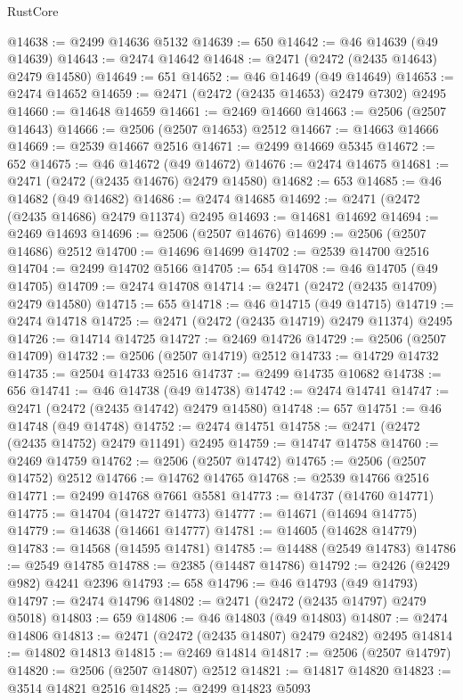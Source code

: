 \begin{lexlean}{RustCore}
\begin{coremodule}
@14638 := @2499 @14636 @5132
@14639 := 650
@14642 := @46 @14639 (@49 @14639)
@14643 := @2474 @14642
@14648 := @2471 (@2472 (@2435 @14643) @2479 @14580)
@14649 := 651
@14652 := @46 @14649 (@49 @14649)
@14653 := @2474 @14652
@14659 := @2471 (@2472 (@2435 @14653) @2479 @7302) @2495
@14660 := @14648 @14659
@14661 := @2469 @14660
@14663 := @2506 (@2507 @14643)
@14666 := @2506 (@2507 @14653) @2512
@14667 := @14663 @14666
@14669 := @2539 @14667 @2516
@14671 := @2499 @14669 @5345
@14672 := 652
@14675 := @46 @14672 (@49 @14672)
@14676 := @2474 @14675
@14681 := @2471 (@2472 (@2435 @14676) @2479 @14580)
@14682 := 653
@14685 := @46 @14682 (@49 @14682)
@14686 := @2474 @14685
@14692 := @2471 (@2472 (@2435 @14686) @2479 @11374) @2495
@14693 := @14681 @14692
@14694 := @2469 @14693
@14696 := @2506 (@2507 @14676)
@14699 := @2506 (@2507 @14686) @2512
@14700 := @14696 @14699
@14702 := @2539 @14700 @2516
@14704 := @2499 @14702 @5166
@14705 := 654
@14708 := @46 @14705 (@49 @14705)
@14709 := @2474 @14708
@14714 := @2471 (@2472 (@2435 @14709) @2479 @14580)
@14715 := 655
@14718 := @46 @14715 (@49 @14715)
@14719 := @2474 @14718
@14725 := @2471 (@2472 (@2435 @14719) @2479 @11374) @2495
@14726 := @14714 @14725
@14727 := @2469 @14726
@14729 := @2506 (@2507 @14709)
@14732 := @2506 (@2507 @14719) @2512
@14733 := @14729 @14732
@14735 := @2504 @14733 @2516
@14737 := @2499 @14735 @10682
@14738 := 656
@14741 := @46 @14738 (@49 @14738)
@14742 := @2474 @14741
@14747 := @2471 (@2472 (@2435 @14742) @2479 @14580)
@14748 := 657
@14751 := @46 @14748 (@49 @14748)
@14752 := @2474 @14751
@14758 := @2471 (@2472 (@2435 @14752) @2479 @11491) @2495
@14759 := @14747 @14758
@14760 := @2469 @14759
@14762 := @2506 (@2507 @14742)
@14765 := @2506 (@2507 @14752) @2512
@14766 := @14762 @14765
@14768 := @2539 @14766 @2516
@14771 := @2499 @14768 @7661 @5581
@14773 := @14737 (@14760 @14771)
@14775 := @14704 (@14727 @14773)
@14777 := @14671 (@14694 @14775)
@14779 := @14638 (@14661 @14777)
@14781 := @14605 (@14628 @14779)
@14783 := @14568 (@14595 @14781)
@14785 := @14488 (@2549 @14783)
@14786 := @2549 @14785
@14788 := @2385 (@14487 @14786)
@14792 := @2426 (@2429 @982) @4241 @2396
@14793 := 658
@14796 := @46 @14793 (@49 @14793)
@14797 := @2474 @14796
@14802 := @2471 (@2472 (@2435 @14797) @2479 @5018)
@14803 := 659
@14806 := @46 @14803 (@49 @14803)
@14807 := @2474 @14806
@14813 := @2471 (@2472 (@2435 @14807) @2479 @2482) @2495
@14814 := @14802 @14813
@14815 := @2469 @14814
@14817 := @2506 (@2507 @14797)
@14820 := @2506 (@2507 @14807) @2512
@14821 := @14817 @14820
@14823 := @3514 @14821 @2516
@14825 := @2499 @14823 @5093

\end{coremodule}
\end{lexlean}
